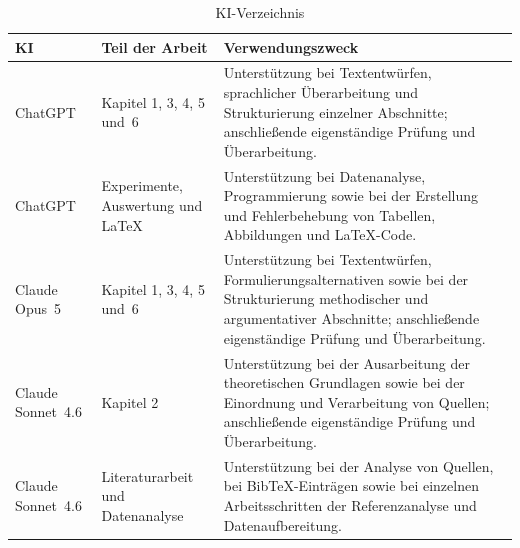 \begin{table}[htbp]
\caption[KI-Verzeichnis]{KI-Verzeichnis}    
\centering
\label{tab:ki-verzeichnis}
\renewcommand{\arraystretch}{1.25}
\begin{tabularx}{\textwidth}{@{}
    >{\raggedright\arraybackslash}p{3.0cm}
    >{\raggedright\arraybackslash}p{3.9cm}
    >{\raggedright\arraybackslash}X @{}}
\toprule
\textbf{KI} & \textbf{Teil der Arbeit} & \textbf{Verwendungszweck} \\
\midrule

ChatGPT
& Kapitel 1, 3, 4, 5 und~6
& Unterstützung bei Textentwürfen, sprachlicher Überarbeitung und
Strukturierung einzelner Abschnitte; anschließende eigenständige
Prüfung und Überarbeitung. \\

\addlinespace

ChatGPT
& Experimente, Auswertung und \LaTeX{}
& Unterstützung bei Datenanalyse, Programmierung sowie bei der
Erstellung und Fehlerbehebung von Tabellen, Abbildungen und
\LaTeX{}-Code. \\

\addlinespace

Claude Opus~5
& Kapitel 1, 3, 4, 5 und~6
& Unterstützung bei Textentwürfen, Formulierungsalternativen sowie
bei der Strukturierung methodischer und argumentativer Abschnitte;
anschließende eigenständige Prüfung und Überarbeitung. \\

\addlinespace

Claude Sonnet~4.6
& Kapitel 2
& Unterstützung bei der Ausarbeitung der theoretischen Grundlagen
sowie bei der Einordnung und Verarbeitung von Quellen; anschließende
eigenständige Prüfung und Überarbeitung. \\

\addlinespace

Claude Sonnet~4.6
& Literaturarbeit und Datenanalyse
& Unterstützung bei der Analyse von Quellen, bei BibTeX-Einträgen
sowie bei einzelnen Arbeitsschritten der Referenzanalyse und
Datenaufbereitung. \\

\bottomrule
\end{tabularx}
\end{table}